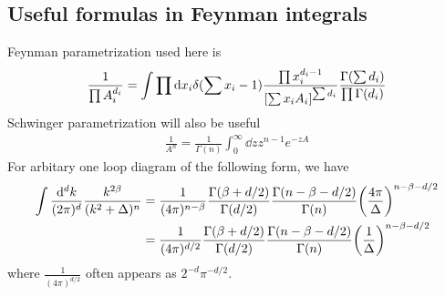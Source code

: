 \documentclass{article}
\newcommand{\vbk}{\vb{k}}
\renewcommand{\a}{\alpha}
\renewcommand{\b}{\beta}
\begin{document}
\begin{appendices}
	\section{Useful formulas in Feynman integrals}
	Feynman parametrization used here is
	\begin{align}
		\frac{1}{\prod A_i^{d_i}}=\int\prod \dd x_i \delta(\sum x_i-1)\frac{\prod x_i^{d_i-1}}{\bqty{\sum x_iA_i}^{\sum d_i}}\frac{\Gamma(\sum d_i)}{\prod\Gamma(d_i)}
		\label{FEYNMANPARA}
	\end{align}
	Schwinger parametrization will also be useful
	\begin{align}
		\frac{1}{A^n}=\frac{1}{\Gamma{(n)}}\int_0^\infty\dd z z^{n-1}e^{-zA}
	\end{align}
	For arbitary one loop diagram of the following form, we have
	\begin{subequations} \label{1loopgamma}
		\begin{align}
			\int\frac{\dd^dk}{(2\pi)^d}\frac{k^{2\b}}{(k^2+\Delta)^n}
			  & =\frac{1}{(4\pi)^{n-\b}}\frac{\Gamma(\b+d/2)}{\Gamma(d/2)}\frac{\Gamma(n-\b-d/2)}{\Gamma(n)}\pqty{\frac{4\pi}{\Delta}}^{n-\b-d/2} \\
			  & =\frac{1}{(4\pi)^{d/2}}\frac{\Gamma(\b+d/2)}{\Gamma(d/2)}\frac{\Gamma(n-\b-d/2)}{\Gamma(n)}\pqty{\frac{1}{\Delta}}^{n-\b-d/2}
		\end{align}
	\end{subequations}
	where $\frac{1}{(4\pi)^{d/2}}$ often appears as $2^{-d}\pi^{-d/2}$.

\end{appendices}
\end{document}
